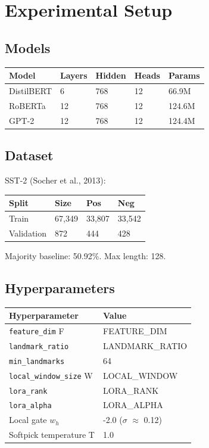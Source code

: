 \section{Experimental Setup}

\subsection{Models}

\begin{table}[H]
\centering
\small
\begin{tabular}{lllll}
\toprule
\textbf{Model} & \textbf{Layers} & \textbf{Hidden} & \textbf{Heads} & \textbf{Params} \\
\midrule
DistilBERT & 6 & 768 & 12 & 66.9M \\
RoBERTa & 12 & 768 & 12 & 124.6M \\
GPT-2 & 12 & 768 & 12 & 124.4M \\
\bottomrule
\end{tabular}
\end{table}

\subsection{Dataset}

SST-2 (Socher et al., 2013):

\begin{table}[H]
\centering
\small
\begin{tabular}{llll}
\toprule
\textbf{Split} & \textbf{Size} & \textbf{Pos} & \textbf{Neg} \\
\midrule
Train & 67,349 & 33,807 & 33,542 \\
Validation & 872 & 444 & 428 \\
\bottomrule
\end{tabular}
\end{table}

Majority baseline: 50.92\%. Max length: 128.

\subsection{Hyperparameters}

\begin{table}[H]
\centering
\small
\begin{tabular}{ll}
\toprule
\textbf{Hyperparameter} & \textbf{Value} \\
\midrule
\texttt{feature\_dim} F & {{FEATURE\_DIM}} \\
\texttt{landmark\_ratio} & {{LANDMARK\_RATIO}} \\
\texttt{min\_landmarks} & 64 \\
\texttt{local\_window\_size} W & {{LOCAL\_WINDOW}} \\
\texttt{lora\_rank} & {{LORA\_RANK}} \\
\texttt{lora\_alpha} & {{LORA\_ALPHA}} \\
Local gate $w_h$ & -2.0 ($\sigma$ $\approx$ 0.12) \\
Softpick temperature T & 1.0 \\
\bottomrule
\end{tabular}
\end{table}

